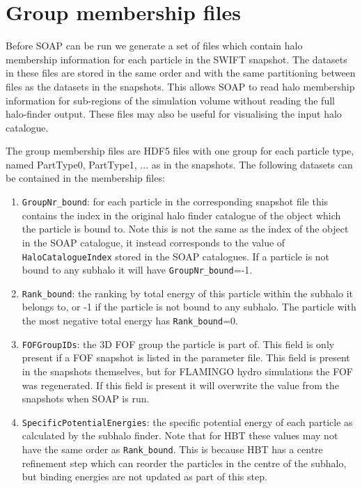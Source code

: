 \documentclass{article}
\begin{document}
\section{Group membership files}

Before SOAP can be run we generate a set of files which contain halo
membership information for each particle in the SWIFT snapshot. The
datasets in these files are stored in the same order and with the same
partitioning between files as the datasets in the snapshots. This
allows SOAP to read halo membership information for sub-regions of the
simulation volume without reading the full halo-finder output. These files may
also be useful for visualising the input halo catalogue.

The group membership files are HDF5 files with one group for each
particle type, named PartType0, PartType1, ... as in the
snapshots. The following datasets can be contained in the membership files:

\begin{enumerate}
\item \verb|GroupNr_bound|: for each particle in the corresponding snapshot
  file this contains the index in the original halo finder catalogue of the object 
  which the particle is bound to. Note this is not the same as the index of the object
  in the SOAP catalogue, it instead corresponds to the value of \verb|HaloCatalogueIndex|
  stored in the SOAP catalogues. If a particle is not bound to any subhalo it
  will have \verb|GroupNr_bound|=-1.
\item \verb|Rank_bound|: the ranking by total energy of this particle within
  the subhalo it belongs to, or -1 if the particle is not bound to
  any subhalo. The particle with the most negative total energy has
  \verb|Rank_bound|=0.
\item \verb|FOFGroupIDs|: the 3D FOF group the particle is part of.
  This field is only present if a FOF snapshot is listed in the
  parameter file. This field is present in the snapshots themselves,
  but for FLAMINGO hydro simulations the FOF was regenerated. If this
  field is present it will overwrite the value from the snapshots when
  SOAP is run.
\item \verb|SpecificPotentialEnergies|: the specific potential energy of
  each particle as calculated by the subhalo finder. Note that for HBT
  these values may not have the same order as \verb|Rank_bound|. This is because
  HBT has a centre refinement step which can reorder the particles in the centre
  of the subhalo, but binding energies are not updated as part of this step.
\end{enumerate}
\end{document}
